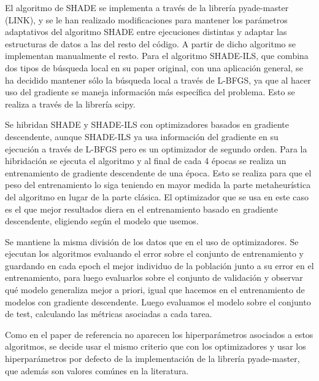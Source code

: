 El algoritmo de SHADE se implementa a través de la librería pyade-master (LINK), y se le han realizado modificaciones para mantener los parámetros adaptativos del algoritmo SHADE entre ejecuciones distintas y adaptar las estructuras de datos a las del resto del código. A partir de dicho algoritmo se implementan manualmente el resto. Para el algoritmo SHADE-ILS, que combina dos tipos de búsqueda local en su paper original, con una aplicación general, se ha decidido mantener sólo la búsqueda local a través de L-BFGS, ya que al hacer uso del gradiente se maneja información más específica del problema. Esto se realiza a través de la librería scipy.

Se hibridan SHADE y SHADE-ILS con optimizadores basados en gradiente descendente, aunque SHADE-ILS ya usa información del gradiente en su ejecución a través de L-BFGS pero es un optimizador de segundo orden. Para la hibridación se ejecuta el algoritmo y al final de cada 4 épocas se realiza un entrenamiento de gradiente descendente de una época. Esto se realiza para que el peso del entrenamiento lo siga teniendo en mayor medida la parte metaheurística del algoritmo en lugar de la parte clásica. El optimizador que se usa en este caso es el que mejor resultados diera en el entrenamiento basado en gradiente descendente, eligiendo según el modelo que usemos.  

Se mantiene la misma división de los datos que en el uso de optimizadores. Se ejecutan los algoritmos evaluando el error sobre el conjunto de entrenamiento y guardando en cada epoch el mejor individuo de la población junto a su error en el entrenamiento, para luego evaluarlos sobre el conjunto de validación y observar qué modelo generaliza mejor a priori, igual que hacemos en el entrenamiento de modelos con gradiente descendente. Luego evaluamos el modelo sobre el conjunto de test, calculando las métricas asociadas a cada tarea.

Como en el paper de referencia no aparecen los hiperparámetros asociados a estos algoritmos, se decide usar el mismo criterio que con los optimizadores y usar los hiperparámetros por defecto de la implementación de la librería pyade-master, que además son valores comúnes en la literatura. 




